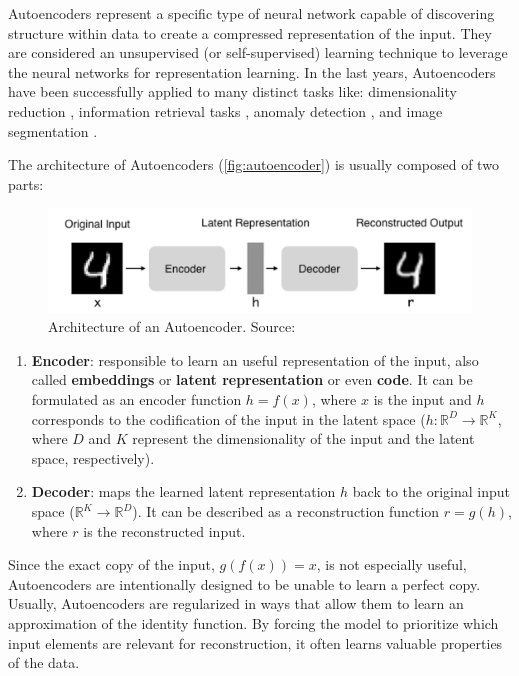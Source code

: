 Autoencoders represent a specific type of neural network capable of discovering structure within data to create a compressed representation of the input. They are considered an unsupervised (or self-supervised) learning technique to leverage the neural networks for representation learning. In the last years, Autoencoders have been successfully applied to many distinct tasks like: dimensionality reduction \citep{petscharnig2017dimensionality, wang2015dimensionality}, information retrieval tasks \citep{pfeiffer2018neural}, anomaly detection \citep{sakurada2014anomaly}, and image segmentation \citep{baur2018deep, karimpouli2019segmentation}.

The architecture of Autoencoders (\autoref{fig:autoencoder}) is usually composed of two parts:

\begin{figure}[h]
\centering
\includegraphics[width=\linewidth]{images/autoencoder.png}
\caption{Architecture of an Autoencoder. Source: \citep{autoencoder_architecture}}
\label{fig:autoencoder}
\end{figure}

\begin{enumerate}
\item \textbf{Encoder}: responsible to learn an useful representation of the input, also called \textbf{embeddings} or \textbf{latent representation} or even \textbf{code}. It can be formulated as an encoder function $h = f(x)$, where $x$ is the input and $h$ corresponds to the codification of the input in the latent space ($h: \mathbb{R}^D \rightarrow \mathbb{R}^K$, where $D$ and $K$ represent the dimensionality of the input and the latent space, respectively).

\item \textbf{Decoder}: maps the learned latent representation $h$ back to the original input space ($\mathbb{R}^K \rightarrow \mathbb{R}^D$). It can be described as a reconstruction function $r = g(h)$, where $r$ is the reconstructed input.
\end{enumerate}

Since the exact copy of the input, $g(f(x)) = x$, is not especially useful, Autoencoders are intentionally designed to be unable to learn a perfect copy. Usually, Autoencoders are regularized in ways that allow them to learn an approximation of the identity function. By forcing the model to prioritize which input elements are relevant for reconstruction,  it often learns valuable properties of the data.

